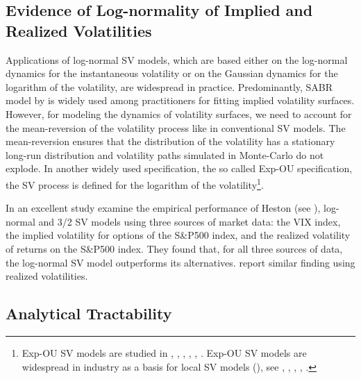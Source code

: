 \documentclass[11pt,a4paper] {article}
\begin{document}
\subsection{Evidence of Log-normality of Implied and Realized Volatilities}

Applications of log-normal SV models, which are based either on the log-normal dynamics for the instantaneous volatility or on the Gaussian dynamics for the logarithm of the volatility, are widespread in practice. Predominantly, SABR model by \cite{Hagan2002} is widely used among practitioners for fitting implied volatility surfaces. However, for modeling the dynamics of volatility surfaces, we need to account for the mean-reversion of the volatility process like in conventional SV models. The mean-reversion ensures that the distribution of the volatility has a stationary long-run distribution and volatility paths simulated in Monte-Carlo do not explode. In another widely used specification, the so called Exp-OU specification, the SV process is defined for the logarithm of the volatility\footnote{Exp-OU SV models are studied in \cite{Fouque2000}, \cite{Detemple2000},  \cite{Masoliver2006}, \cite{perello2008}, \cite{MuhleKarbe2012}, \cite{drimus2012a}. Exp-OU SV models are widespread in industry as a basis for local SV models (\cite{Lipton2002}), see \cite{bergomi2005}, \cite{buhler2006}, \cite{RenMadan2007}, \cite{labord2009}, \cite{bergomi2012}.}. 

In an excellent study \cite{Christof2010} examine the empirical performance of Heston (see \cite{Heston1993}), log-normal and 3/2 SV models using three sources of market data: the VIX index, the implied volatility for options of the S\&P500 index, and the realized volatility of returns on the S\&P500 index. They found that, for all three sources of data, the log-normal SV model outperforms its alternatives. \cite{Tegner2018} report similar finding using realized volatilities.  



\subsection{Analytical Tractability}
\end{document}
